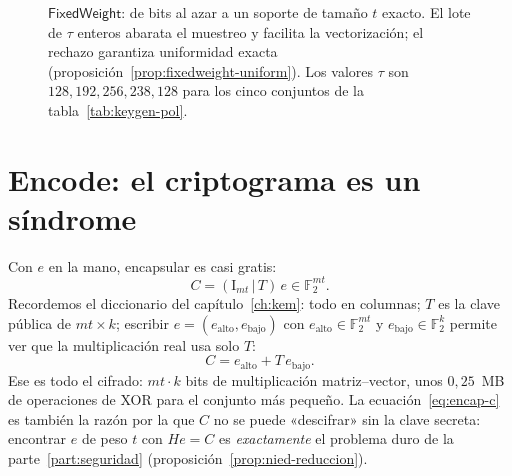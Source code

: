 \documentclass[11pt,a4paper,oneside]{report}
\newcommand{\F}{\mathbb{F}}
\newcommand{\Ftwo}{\F_2}
\begin{document}
\begin{figure}[htbp]
\centering
{}
\caption{$\textsf{FixedWeight}$: de bits al azar a un soporte de
tamaño $t$ exacto. El lote de $\tau$ enteros abarata el muestreo y
facilita la vectorización; el rechazo garantiza uniformidad exacta
(proposición~\ref{prop:fixedweight-uniform}). Los valores $\tau$ son
$128,192,256,238,128$ para los cinco conjuntos de la
tabla~\ref{tab:keygen-pol}.}
\label{fig:fixedweight}
\end{figure}

\section{\textsf{Encode}: el criptograma es un síndrome}

Con $e$ en la mano, encapsular es casi gratis:
\[
  C=(\mathrm{I}_{mt}\,|\,T)\,e \in \Ftwo^{mt}.
  \label{eq:encap-c}
\]
Recordemos el diccionario del capítulo~\ref{ch:kem}: todo en columnas;
$T$ es la clave pública de $mt\times k$; escribir $e=(e_{\mathrm{alto}},
e_{\mathrm{bajo}})$ con $e_{\mathrm{alto}}\in\Ftwo^{mt}$ y
$e_{\mathrm{bajo}}\in\Ftwo^{k}$ permite ver que la multiplicación real
usa solo $T$:
\[
  C=e_{\mathrm{alto}}+T\,e_{\mathrm{bajo}}.
\]
Ese es todo el cifrado: $mt\cdot k$ bits de multiplicación
matriz--vector, unos $0{,}25$~MB de operaciones de XOR para el conjunto
más pequeño. La ecuación~\eqref{eq:encap-c} es también la
razón por la que $C$ no se puede «descifrar» sin la clave secreta:
encontrar $e$ de peso $t$ con $He=C$ es \emph{exactamente} el problema
duro de la parte~\ref{part:seguridad} (proposición~\ref{prop:nied-reduccion}).
\end{document}
